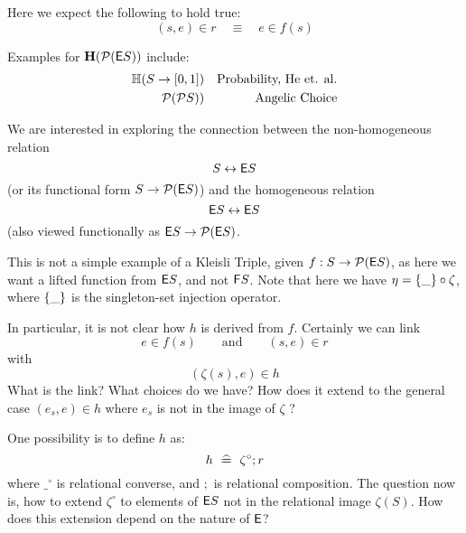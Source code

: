 
Here we expect the following to hold true:
\[
  (s,e) \in r \quad\equiv\quad e \in f(s)
\]

Examples for $\mathbf{H}(\mathcal{P}(\mathsf{E} S))$ include:
\begin{eqnarray*}
   \mathbb{H}(S \rightarrow [0,1]) && \mbox{Probability, He et. al.}
\\ \mathcal{P}(\mathcal{P} S)) && \mbox{Angelic Choice}
\end{eqnarray*}

We are interested in exploring the connection between
the non-homogeneous relation
\[ S \leftrightarrow \mathsf{E} S\]
(or its functional form $S \rightarrow \mathcal{P}(\mathsf{E} S)$)
and the homogeneous relation
\[ \mathsf{E} S \leftrightarrow \mathsf{E} S \]
(also viewed functionally as $\mathsf{E} S \rightarrow \mathcal{P}(\mathsf{E} S)$.


This is not a simple example of a Kleisli Triple,
given $f : S \rightarrow \mathcal{P} (\mathsf{E} S)$,
as here we want a lifted function from
$\mathsf{E} S$, and not $\mathsf{F} S$.
Note that here we have $\eta = \{\_\} \circ \zeta$, where $\{\_\}$ is the
singleton-set injection operator.

In particular, it is not clear how $h$ is derived from $f$.
Certainly we can link
\[
 e \in f(s)
 \qquad \mbox{and} \qquad
 (s,e) \in r
\]
with
\[
  (\zeta(s),e) \in h
\]
What is the link? What choices do we have?
How does it extend to the general case $(e_s,e) \in h$
where $e_s$ is not in the image of $\zeta$ ?

One possibility is to define $h$ as:
\[
  h  \mathrel{~\widehat{=\!\!\!\!=}}~  \zeta^\circ ; r
\]
where $\_^\circ$ is relational converse, and $;$ is relational composition.
The question now is, how to extend $\zeta^\circ$ to elements of $\mathsf{E} S$ not in
the relational image $\zeta(S)$. How does this extension depend on the nature of
$\mathsf{E}$?
